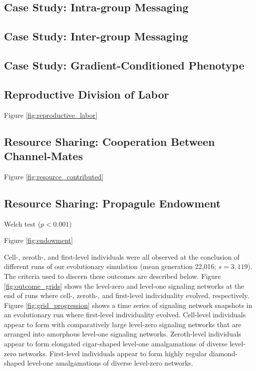 

\subsection{Case Study: Intra-group Messaging}



\subsection{Case Study: Inter-group Messaging}



\subsection{Case Study: Gradient-Conditioned Phenotype}




\subsection{Reproductive Division of Labor}

Figure \ref{fig:reproductive_labor}

\subsection{Resource Sharing: Cooperation Between Channel-Mates}

Figure \ref{fig:resource_contributed}

\subsection{Resource Sharing: Propagule Endowment}

Welch test ($p < 0.001$)

Figure \ref{fig:endowment}


Cell-, zeroth-, and first-level individuals were all observed at the conclusion of different runs of our evolutionary simulation (mean generation 22,016; $s=3,119$).
The criteria used to discern these outcomes are described below.
Figure \ref{fig:outcome_grids} shows the level-zero and level-one signaling networks at the end of runs where cell-, zeroth-, and first-level individuality evolved, respectively.
Figure \ref{fig:grid_progression} shows a time series of signaling network snapshots in an evolutionary run where first-level individuality evolved.
Cell-level individuals appear to form with comparatively large level-zero signaling networks that are arranged into amorphous level-one signaling networks.
Zeroth-level individuals appear to form elongated cigar-shaped level-one amalgamations of diverse level-zero networks.
First-level individuals appear to form highly regular diamond-shaped level-one amalgamations of diverse level-zero networks.

